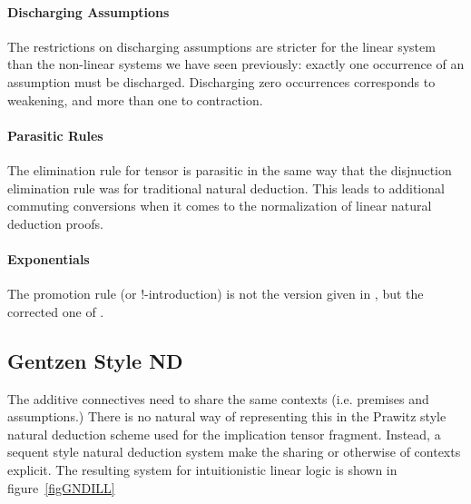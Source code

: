 \paragraph{Discharging Assumptions}  
The restrictions on discharging
assumptions are stricter for the linear system than the non-linear
systems we have seen previously: exactly one occurrence of an
assumption must be discharged.  Discharging zero occurrences
corresponds to weakening, and more than one to contraction.

\paragraph{Parasitic Rules}  The elimination rule for tensor is 
parasitic in the same way that the disjnuction elimination rule was
for traditional natural deduction.  This leads to additional commuting
conversions when it comes to the normalization of linear natural
deduction proofs.



\paragraph{Exponentials}
The promotion rule (or !-introduction) is not the version given in
, but the corrected one of .

\subsection{Gentzen Style ND}
The additive connectives need to share the same contexts (i.e. premises and
assumptions.)  There is no natural way of representing this in the
Prawitz style natural deduction scheme used for the implication tensor
fragment.  Instead, a sequent style natural deduction system make the
sharing or otherwise of contexts explicit.  The resulting system for
intuitionistic linear logic is shown in
figure~\ref{figGNDILL}


